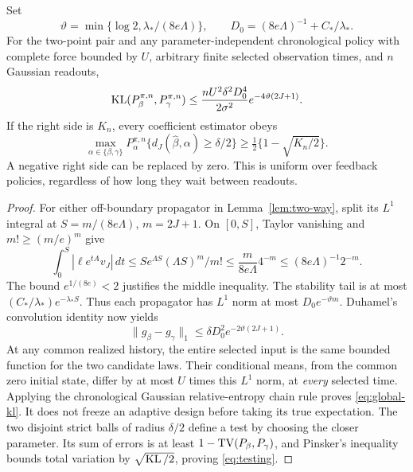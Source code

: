 \begin{theorem}
\label{thm:global-frontier}
Set
\[
 \vartheta=\min\{\log2,\lambda_* /(8e\Lambda)\},\qquad
 D_0=(8e\Lambda)^{-1}+C_*/\lambda_*.
\]
For the two-point pair and any parameter-independent chronological policy
with complete force bounded by $U$, arbitrary finite selected observation
times, and $n$ Gaussian readouts,
\begin{equation}
 \operatorname{KL}(P_\beta^{\pi,n},P_\gamma^{\pi,n})
 \le \frac{nU^2\delta^2D_0^4}{2\sigma^2}
                       e^{-4\vartheta(2J+1)}.
 \label{eq:global-kl}
\end{equation}
If the right side is $K_n$, every coefficient estimator obeys
\begin{equation}
 \max_{\alpha\in\{\beta,\gamma\}}
 P_\alpha^{\pi,n}\{d_J(\widehat\beta,\alpha)\ge\delta/2\}
 \ge\tfrac12\{1-\sqrt{K_n/2}\}.
 \label{eq:testing}
\end{equation}
A negative right side can be replaced by zero. This is uniform over feedback
policies, regardless of how long they wait between readouts.
\end{theorem}
\begin{proof}
For either off-boundary propagator in Lemma~\ref{lem:two-way}, split its
$L^1$ integral at $S=m/(8e\Lambda)$, $m=2J+1$. On $[0,S]$, Taylor vanishing
and $m!\ge(m/e)^m$ give
\[
 \int_0^S|\ell e^{tA}v_J|\,dt
 \le S e^{\Lambda S}(\Lambda S)^m/m!
 \le \frac{m}{8e\Lambda}4^{-m}
 \le(8e\Lambda)^{-1}2^{-m}.
\]
The bound $e^{1/(8e)}<2$ justifies the middle inequality. The stability tail
is at most $(C_*/\lambda_*)e^{-\lambda_*S}$. Thus each propagator has
$L^1$ norm at most $D_0e^{-\vartheta m}$.
Duhamel's convolution identity now yields
\[
 \|g_\beta-g_\gamma\|_1\le\delta D_0^2e^{-2\vartheta(2J+1)}.
\]
At any common realized history, the entire selected input is the same bounded
function for the two candidate laws. Their conditional means, from the common
zero initial state, differ by at most $U$ times this $L^1$ norm, at \emph{every}
selected time. Applying the chronological Gaussian relative-entropy chain rule
proves \eqref{eq:global-kl}. It does not freeze an adaptive design before
taking its true expectation. The two disjoint strict balls of radius
$\delta/2$ define a test by choosing the closer parameter. Its sum of errors
is at least $1-\operatorname{TV}(P_\beta,P_\gamma)$, and Pinsker's inequality bounds total
variation by $\sqrt{\operatorname{KL}/2}$, proving \eqref{eq:testing}.
\end{proof}

